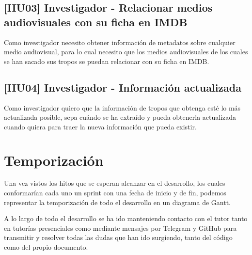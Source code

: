 \subsection{[HU03] Investigador - Relacionar medios audiovisuales con su ficha en IMDB}
Como investigador necesito obtener información de metadatos sobre cualquier medio audiovisual, para lo cual necesito que los medios audiovisuales de los cuales se han sacado sus tropos se puedan relacionar con su ficha en IMDB.

\subsection{[HU04] Investigador - Información actualizada}
Como investigador quiero que la información de tropos que obtenga esté lo más actualizada posible, sepa cuándo se ha extraído y pueda obtenerla actualizada cuando quiera para traer la nueva información que pueda existir.

\section{Temporización}
Una vez vistos los hitos que se esperan alcanzar en el desarrollo, los cuales conformarían cada uno un sprint con una fecha de inicio y de fin, podemos representar la temporización de todo el desarrollo en un diagrama de Gantt.

A lo largo de todo el desarrollo se ha ido manteniendo contacto con el tutor tanto en tutorías presenciales como mediante mensajes por Telegram y GitHub para transmitir y resolver todas las dudas que han ido surgiendo, tanto del código como del propio documento.
